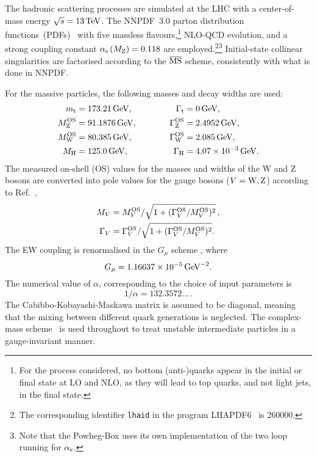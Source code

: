 The hadronic scattering processes are simulated at the LHC with a center-of-mass energy $\sqrt s = 13 \,\text{TeV}$.
The NNPDF~3.0 parton distribution functions~(PDFs)~\cite{Ball:2014uwa} with five massless flavours,\footnote{For the process considered, no bottom (anti-)quarks appear in the initial or final state at LO and NLO, as they will lead to top quarks, and not light jets, in the final state.} 
NLO-QCD evolution, and a strong coupling constant $\alpha_\text{s}\left( M_\text{Z} \right) = 0.118$ are employed.\footnote{The corresponding identifier {\tt lhaid} in the program LHAPDF6~\cite{Buckley:2014ana} is 260000.}\footnote{Note that the {\sc Powheg-Box} uses its own implementation of the two loop running for $\alpha_{\rm s}$.}
Initial-state collinear singularities are factorised according to the ${\overline{\rm MS}}$ scheme, consistently with what is done in NNPDF.

For the massive particles, the following masses and decay widths are used:
%
\begin{alignat}{2}
                  m_\text{t}   &=  173.21\,\text{GeV},       & \quad \quad \quad \Gamma_\text{t} &= 0 \,\text{GeV},  \nonumber \\
                M_\text{Z}^\text{OS} &=  91.1876\,\text{GeV},      & \quad \quad \quad \Gamma_\text{Z}^\text{OS} &= 2.4952\,\text{GeV},  \nonumber \\
                M_\text{W}^\text{OS} &=  80.385\,\text{GeV},       & \Gamma_\text{W}^\text{OS} &= 2.085\,\text{GeV},  \nonumber \\
                M_{\rm H} &=  125.0\,\text{GeV},       &  \Gamma_\text{H}   &=  4.07 \times 10^{-3}\,\text{GeV}.
\end{alignat}
%
The measured on-shell (OS) values for the masses and widths of the W and Z bosons are converted into pole values for the gauge bosons ($V=\text{W},\text{Z}$) according to Ref.~\cite{Bardin:1988xt},
%
\begin{equation}
\begin{split}
        M_V &= M_{V}^\text{OS}/\sqrt{1+(\Gamma_{V}^\text{OS}/M_{V}^\text{OS})^2}\,, \\
   \Gamma_V &= \Gamma_{V}^\text{OS}/\sqrt{1+(\Gamma_{V}^\text{OS}/M_{V}^\text{OS})^2}.
\end{split}
\end{equation}
%
The EW coupling is renormalised in the $G_\mu$ scheme \cite{Denner:2000bj}, where
%
\begin{equation}
    G_{\mu}    = 1.16637\times 10^{-5}\,\text{GeV}^{-2}.
\end{equation}
%
The numerical value of $\alpha$, corresponding to the choice of input parameters is
%
\begin{equation}
 1/\alpha = 132.3572\ldots\,.
\end{equation}
The Cabibbo-Kobayashi-Maskawa matrix is assumed to be diagonal, meaning that the mixing between different quark generations is neglected.
The complex-mass scheme~\cite{Denner:1999gp,Denner:2005fg,Denner:2006ic} is used throughout to treat unstable intermediate particles in a gauge-invariant manner.

